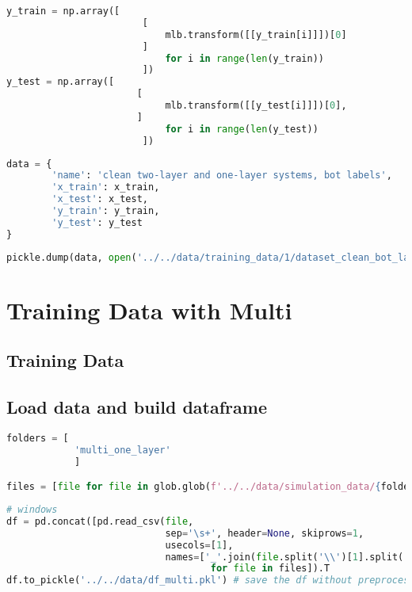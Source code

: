 \begin{lstlisting}[language=Python]
y_train = np.array([    
                        [
                            mlb.transform([[y_train[i]]])[0]
                        ] 
                            for i in range(len(y_train))
                        ])
y_test = np.array([ 
                       [
                            mlb.transform([[y_test[i]]])[0],
                       ] 
                            for i in range(len(y_test))
                        ])
\end{lstlisting}

\begin{lstlisting}[language=Python]
data = {
        'name': 'clean two-layer and one-layer systems, bot labels',
        'x_train': x_train,
        'x_test': x_test,
        'y_train': y_train,
        'y_test': y_test
}
\end{lstlisting}

\begin{lstlisting}[language=Python]
pickle.dump(data, open('../../data/training_data/1/dataset_clean_bot_layer.pkl', 'wb'))
\end{lstlisting}

\hypertarget{training-data-with-multi}{%
\section{Training Data with Multi}\label{training-data-with-multi}}

\hypertarget{training-data}{%
\subsection{Training Data}\label{training-data}}

\hypertarget{load-data-and-build-dataframe}{%
\subsection{Load data and build
dataframe}\label{load-data-and-build-dataframe}}

\begin{lstlisting}[language=Python]
folders = [
            'multi_one_layer'
            ]

files = [file for file in glob.glob(f'../../data/simulation_data/{folders[0]}/*.spc')]
\end{lstlisting}

\begin{lstlisting}[language=Python]
# windows
df = pd.concat([pd.read_csv(file,
                            sep='\s+', header=None, skiprows=1,
                            usecols=[1],
                            names=['_'.join(file.split('\\')[1].split('_')[:-1])]).T 
                                    for file in files]).T
df.to_pickle('../../data/df_multi.pkl') # save the df without preprocessing
\end{lstlisting}

